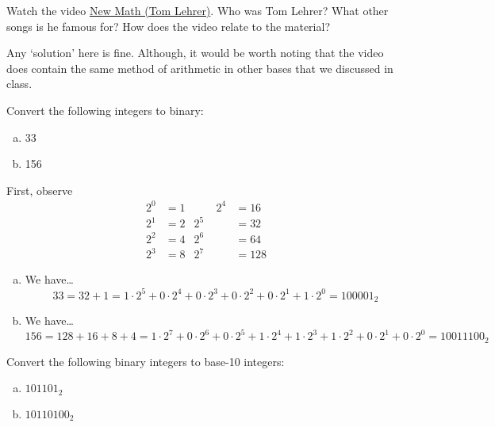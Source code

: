 \documentclass[11pt,letterpaper]{article}
\begin{document}

 Watch the video \href{https://www.youtube.com/watch?v=UIKGV2cTgqA&ab_channel=JaredKhan}{New Math (Tom Lehrer)}. Who was Tom Lehrer? What other songs is he famous for? How does the video relate to the material? \pspace

\sol Any `solution' here is fine. Although, it would be worth noting that the video does contain the same method of arithmetic in other bases that we discussed in class. 





\newpage





 Convert the following integers to binary:
        \begin{enumerate}[(a)]
        \item 33
        \item 156
        \end{enumerate} \pspace

\sol First, observe
	\[
	\begin{aligned}
	2^0&= 1 &\quad\quad 2^4&= 16 \\
	2^1&= 2 & 2^5&= 32 \\
	2^2&= 4 & 2^6&= 64 \\
	2^3&= 8 & 2^7&= 128
	\end{aligned}
	\]

\begin{enumerate}[(a)]
\item We have\dots
	\[
	33= 32 + 1= 1 \cdot 2^5 + 0 \cdot 2^4 + 0 \cdot 2^3 + 0 \cdot 2^2 + 0 \cdot 2^1 + 1 \cdot 2^0= 100001_2
	\]

\item We have\dots
	\[
	156= 128 + 16 + 8 + 4= 1 \cdot 2^7 + 0 \cdot 2^6 + 0 \cdot 2^5 + 1 \cdot 2^4 + 1 \cdot 2^3 + 1 \cdot 2^2 + 0 \cdot 2^1 + 0 \cdot 2^0= 10011100_2
	\]
\end{enumerate}





\newpage





 Convert the following binary integers to base-10 integers:
        \begin{enumerate}[(a)]
        \item $101101_2$
        \item $10110100_2$
        \end{enumerate} \pspace
\end{document}
